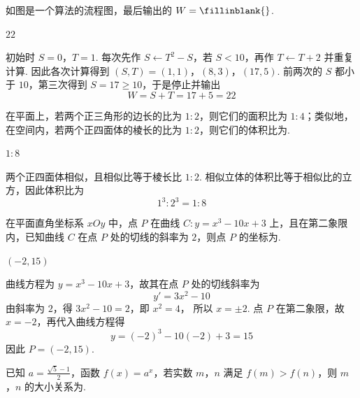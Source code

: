 \begin{problem}
如图是一个算法的流程图，最后输出的 \(W=\fillinblank{}\).

\end{problem}

\begin{answer}
\(22\)
\end{answer}

\begin{solution}
初始时 \(S=0\)，\(T=1\). 每次先作 \(S\leftarrow T^2-S\)，若 \(S<10\)，再作 \(T\leftarrow T+2\) 并重复计算. 因此各次计算得到
\((S,T)=(1,1)\)，\((8,3)\)，\((17,5)\).
前两次的 \(S\) 都小于 \(10\)，第三次得到 \(S=17\ge10\)，于是停止并输出
\[
W=S+T=17+5=22
\]
\end{solution}

\begin{problem}
在平面上，若两个正三角形的边长的比为 \(1:2\)，则它们的面积比为 \(1:4\)；类似地，在空间内，若两个正四面体的棱长的比为 \(1:2\)，则它们的体积比为\fillinblank{}.
\end{problem}

\begin{answer}
\(1:8\)
\end{answer}

\begin{solution}
两个正四面体相似，且相似比等于棱长比 \(1:2\). 相似立体的体积比等于相似比的立方，因此体积比为
\[
1^3:2^3=1:8
\]
\end{solution}

\begin{problem}
在平面直角坐标系 \(xOy\) 中，点 \(P\) 在曲线 \(C:y=x^3-10x+3\) 上，且在第二象限内，已知曲线 \(C\) 在点 \(P\) 处的切线的斜率为 \(2\)，则点 \(P\) 的坐标为\fillinblank{}.
\end{problem}

\begin{answer}
\((-2,15)\)
\end{answer}

\begin{solution}
曲线方程为 \(y=x^3-10x+3\)，故其在点 \(P\) 处的切线斜率为
\[
y'=3x^2-10
\]
由斜率为 \(2\)，得
\(3x^2-10=2\)，即 \(x^2=4\)，
所以 \(x=\pm2\). 点 \(P\) 在第二象限，故 \(x=-2\)，再代入曲线方程得
\[
y=(-2)^3-10(-2)+3=15
\]
因此 \(P=(-2,15)\).
\end{solution}

\begin{problem}
已知 \(a=\frac{\sqrt5-1}{2}\)，函数 \(f(x)=a^x\)，若实数 \(m\)，\(n\) 满足 \(f(m)>f(n)\)，则 \(m\)，\(n\) 的大小关系为\fillinblank{}.
\end{problem}

